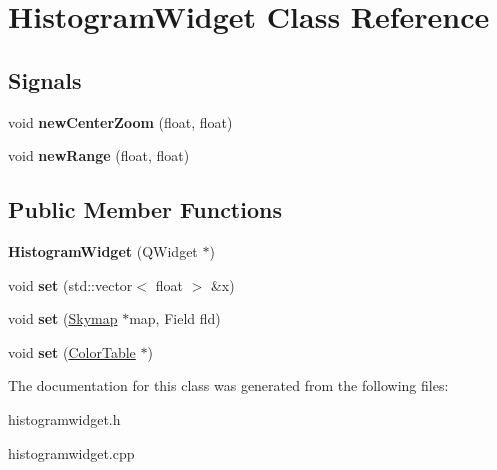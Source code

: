\hypertarget{classHistogramWidget}{
\section{HistogramWidget Class Reference}
\label{classHistogramWidget}
}
\subsection*{Signals}
\begin{DoxyCompactItemize}
\item 
\hypertarget{classHistogramWidget_a6f6c13428da988cc4c5b05ccd2b0bf80}{
void {\bfseries newCenterZoom} (float, float)}
\label{classHistogramWidget_a6f6c13428da988cc4c5b05ccd2b0bf80}

\item 
\hypertarget{classHistogramWidget_a8f69afe6196c6a845326c1fa9f435da6}{
void {\bfseries newRange} (float, float)}
\label{classHistogramWidget_a8f69afe6196c6a845326c1fa9f435da6}

\end{DoxyCompactItemize}
\subsection*{Public Member Functions}
\begin{DoxyCompactItemize}
\item 
\hypertarget{classHistogramWidget_a05c46c83cf35d080c47a57c506ce2dc2}{
{\bfseries HistogramWidget} (QWidget $\ast$)}
\label{classHistogramWidget_a05c46c83cf35d080c47a57c506ce2dc2}

\item 
\hypertarget{classHistogramWidget_a3474280d2f5c0ef6bc68fb8728f9f0e3}{
void {\bfseries set} (std::vector$<$ float $>$ \&x)}
\label{classHistogramWidget_a3474280d2f5c0ef6bc68fb8728f9f0e3}

\item 
\hypertarget{classHistogramWidget_a7c6d2d744d0eb8e07f4a8b841d10d40d}{
void {\bfseries set} (\hyperlink{classSkymap}{Skymap} $\ast$map, Field fld)}
\label{classHistogramWidget_a7c6d2d744d0eb8e07f4a8b841d10d40d}

\item 
\hypertarget{classHistogramWidget_a749d5fd0ad705b557df87cef0e4b000c}{
void {\bfseries set} (\hyperlink{classColorTable}{ColorTable} $\ast$)}
\label{classHistogramWidget_a749d5fd0ad705b557df87cef0e4b000c}

\end{DoxyCompactItemize}


The documentation for this class was generated from the following files:\begin{DoxyCompactItemize}
\item 
histogramwidget.h\item 
histogramwidget.cpp\end{DoxyCompactItemize}

